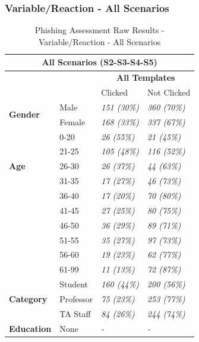 \documentclass[a4paper]{article}
\begin{document}
\newpage

\subsubsection*{Variable/Reaction - All Scenarios}

\begingroup
\renewcommand{\arraystretch}{1.25}
\begin{table}[ht]
\begin{center}
    \begin{tabular}{ | m{7em} | m{9em} | m{9em} | m{9em} | }
    \hline
    \multicolumn{4}{|c|}{\textbf{All Scenarios (S2-S3-S4-S5)}} \\ \hline
    & & \multicolumn{2}{|c|}{\textbf{All Templates}} \\ \hline
    & & Clicked & Not Clicked \\ \hline
    
    \multirow{2}{*}{\textbf{Gender}} 
    & Male & \textit{151 (30\%)} & \textit{360 (70\%)} \\ \cline{2-4}
    & Female & \textit{168 (33\%)} & \textit{337 (67\%)} \\ \hline
    
    \multirow{5}{*}{\textbf{Age}} 
    & 0-20 & \textit{26 (55\%)} & \textit{21 (45\%)} \\ \cline{2-4}
    & 21-25 & \textit{105 (48\%)} & \textit{116 (52\%)} \\ \cline{2-4}
    & 26-30 & \textit{26 (37\%)} & \textit{44 (63\%)} \\ \cline{2-4}
    & 31-35 & \textit{17 (27\%)} & \textit{46 (73\%)} \\ \cline{2-4}
    & 36-40 & \textit{17 (20\%)} & \textit{70 (80\%)} \\ \cline{2-4}
    & 41-45 & \textit{27 (25\%)} & \textit{80 (75\%)} \\ \cline{2-4}
    & 46-50 & \textit{36 (29\%)} & \textit{89 (71\%)} \\ \cline{2-4}
    & 51-55 & \textit{35 (27\%)} & \textit{97 (73\%)} \\ \cline{2-4}
    & 56-60 & \textit{19 (23\%)} & \textit{62 (77\%)} \\ \cline{2-4}
    & 61-99 & \textit{11 (13\%)} & \textit{72 (87\%)} \\ \hline
    
    \multirow{3}{*}{\textbf{Category}} 
    & Student & \textit{160 (44\%)} & \textit{200 (56\%)} \\ \cline{2-4}
    & Professor & \textit{75 (23\%)} & \textit{253 (77\%)} \\ \cline{2-4}
    & TA Staff & \textit{84 (26\%)} & \textit{244 (74\%)} \\ \hline
    
    \multirow{1}{*}{\textbf{Education}}
    & None & \textit{-} & \textit{-} \\ \hline
    \end{tabular}
\end{center}
\caption{Phishing Assessment Raw Results - Variable/Reaction - All Scenarios}
\label{t-varreact1}
\end{table}
\endgroup
\end{document}
